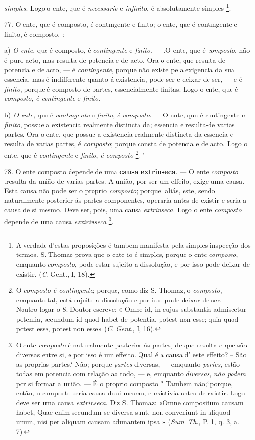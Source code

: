  \emph{simples}. Logo o ente, que é \emph{necessario} e \emph{infinito}, é absolutamente simples \footnote{A verdade d'estas proposições é tambem manifesta pela simples inspecção dos termos. S. Thomaz prova que o ente io é simples, porque o ente \emph{composto}, emquanto \emph{composto}, pode estar sujeito a dissolução, e por isso pode deixar de existir. (\emph{C}. Gent., I, 18).}.

77. O ente, que é composto, é contingente e finito; o ente, que é contingente e finito, é composto. :

a) \emph{O ente}, que é composto, é \emph{contingente} e \emph{finito}. --- .O ente, que é \emph{composto}, não é puro acto, mas resulta de potencia e de acto. Ora o ente, que resulta de potencia e de acto, --- é \emph{contingente}, porque não existe pela exigencia da sua essencia, mas é indifferente quanto á existencia, pode ser e deixar de ser, --- e é \emph{finito}, porque é composto de partes, essencialmente finitas. Logo o ente, que é \emph{composto}, \emph{é contingente} e \emph{finito}.

b) \emph{O ente}, que é \emph{contingente} e \emph{finito}, \emph{é composto}. --- O ente, que é contingente e \emph{finito}, possue a existencia realmente distincta da; essencia e resulta-de varias partes. Ora o ente, que possue a existencia realmente distincta da essencia e resulta de varias partes, é \emph{composto}; porque consta de potencia e de acto. Logo o ente, que é \emph{contingente} e \emph{finito}, \emph{é composto} \footnote{O \emph{composto é contingente}; porque, como diz S. Thomaz, o \emph{composto}, emquanto tal, está sujeito a dissolução e por isso pode deixar de ser. --- Noutro logar o 8. Doutor escreve: « Omne id, in cujus substantia admiscetur potenlia, secundum id quod habet de potentia, potest non esse; quia quod potest esse, potest non esse» (\emph{C}. \emph{Gent}., I, 16).}. '

78. O ente composto depende de uma \textbf{causa extrinseca}. --- O ente \emph{composto} .resulta da união de varias partes. A união, por ser um effeito, exige uma causa. Esta causa não pode ser o proprio \emph{composto}; porque. aliás, este, sendo naturalmente posterior ás partes componentes, operaria antes de existir e seria a causa de si mesmo. Deve ser, pois, uma causa \emph{extrinseca}. Logo o ente \emph{composto} depende de uma causa \emph{ezxirinseca} \footnote{O ente \emph{composto} é naturalmente posterior ás partes, de que resulta e que são diversas entre si, e por isso é um effeito. Qual é a causa d' este effeito? -- São as proprias partes? Não; porque \emph{partes} diversas, --- emquanto \emph{paries}, estão todas em potencia com relação ao todo, --- e, emquanto \emph{diversas}, \emph{não podem} por si formar a união. --- É o proprio composto ? Tambem não;“porque, então, o composto seria causa de si mesmo, e existivia antes de existir. Logo deve ser uma causa \emph{extrinseca}. Diz S. Thomaz: «Omne compositum causam habet, Quae enim secundum se diversa sunt, non conveniunt in aliquod unum, nisi per aliquam causam adunantem ipsa » (\emph{Sum}. \emph{Th}., P. 1, q. 3, a. 7).}.


